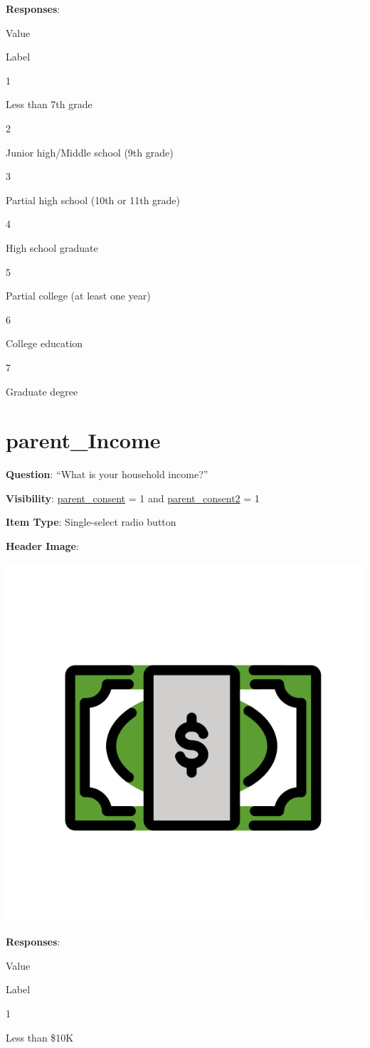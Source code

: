 \documentclass[]{book}
\begin{document}
\textbf{Responses}:

Value

Label

1

Less than 7th grade

2

Junior high/Middle school (9th grade)

3

Partial high school (10th or 11th grade)

4

High school graduate

5

Partial college (at least one year)

6

College education

7

Graduate degree

\hypertarget{parent_income}{%
\section{parent\_Income}\label{parent_income}}

\textbf{Question}: ``What is your household income?''

\textbf{Visibility}: \protect\hyperlink{parent_consent}{parent\_consent} = 1 and \protect\hyperlink{parent_consent2}{parent\_consent2} = 1

\textbf{Item Type}: Single-select radio button

\textbf{Header Image}:

\begin{flushleft}\includegraphics[width=0.33\linewidth]{downloadFigs4latex_HBN_PMHS_Codebook/parent_Income_headerImg} \end{flushleft}

\textbf{Responses}:

Value

Label

1

Less than \$10K
\end{document}
